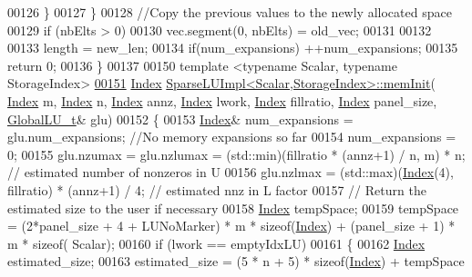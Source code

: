 \begin{DoxyCode}
00126     \}
00127   \}
00128   \textcolor{comment}{//Copy the previous values to the newly allocated space }
00129   \textcolor{keywordflow}{if} (nbElts > 0)
00130     vec.segment(0, nbElts) = old\_vec;   
00131    
00132   
00133   length  = new\_len;
00134   \textcolor{keywordflow}{if}(num\_expansions) ++num\_expansions;
00135   \textcolor{keywordflow}{return} 0; 
00136 \}
00137 
00150 \textcolor{keyword}{template} <\textcolor{keyword}{typename} Scalar, \textcolor{keyword}{typename} StorageIndex>
\hyperlink{group___sparse_l_u___module_ac018b8ed9664d4e19e34f1ff2d6c578a}{00151} \hyperlink{namespace_eigen_a62e77e0933482dafde8fe197d9a2cfde}{Index} \hyperlink{group___sparse_l_u___module_ac018b8ed9664d4e19e34f1ff2d6c578a}{SparseLUImpl<Scalar,StorageIndex>::memInit}(
      \hyperlink{namespace_eigen_a62e77e0933482dafde8fe197d9a2cfde}{Index} m, \hyperlink{namespace_eigen_a62e77e0933482dafde8fe197d9a2cfde}{Index} n, \hyperlink{namespace_eigen_a62e77e0933482dafde8fe197d9a2cfde}{Index} annz, \hyperlink{namespace_eigen_a62e77e0933482dafde8fe197d9a2cfde}{Index} lwork, \hyperlink{namespace_eigen_a62e77e0933482dafde8fe197d9a2cfde}{Index} fillratio, 
      \hyperlink{namespace_eigen_a62e77e0933482dafde8fe197d9a2cfde}{Index} panel\_size,  \hyperlink{struct_eigen_1_1internal_1_1_l_u___global_l_u__t}{GlobalLU\_t}& glu)
00152 \{
00153   \hyperlink{namespace_eigen_a62e77e0933482dafde8fe197d9a2cfde}{Index}& num\_expansions = glu.num\_expansions; \textcolor{comment}{//No memory expansions so far}
00154   num\_expansions = 0;
00155   glu.nzumax = glu.nzlumax = (std::min)(fillratio * (annz+1) / n, m) * n; \textcolor{comment}{// estimated number of nonzeros
       in U }
00156   glu.nzlmax = (std::max)(\hyperlink{namespace_eigen_a62e77e0933482dafde8fe197d9a2cfde}{Index}(4), fillratio) * (annz+1) / 4; \textcolor{comment}{// estimated  nnz in L factor}
00157   \textcolor{comment}{// Return the estimated size to the user if necessary}
00158   \hyperlink{namespace_eigen_a62e77e0933482dafde8fe197d9a2cfde}{Index} tempSpace;
00159   tempSpace = (2*panel\_size + 4 + LUNoMarker) * m * \textcolor{keyword}{sizeof}(\hyperlink{namespace_eigen_a62e77e0933482dafde8fe197d9a2cfde}{Index}) + (panel\_size + 1) * m * \textcolor{keyword}{sizeof}(
      Scalar);
00160   \textcolor{keywordflow}{if} (lwork == emptyIdxLU) 
00161   \{
00162     \hyperlink{namespace_eigen_a62e77e0933482dafde8fe197d9a2cfde}{Index} estimated\_size;
00163     estimated\_size = (5 * n + 5) * \textcolor{keyword}{sizeof}(\hyperlink{namespace_eigen_a62e77e0933482dafde8fe197d9a2cfde}{Index})  + tempSpace

\end{DoxyCode}
